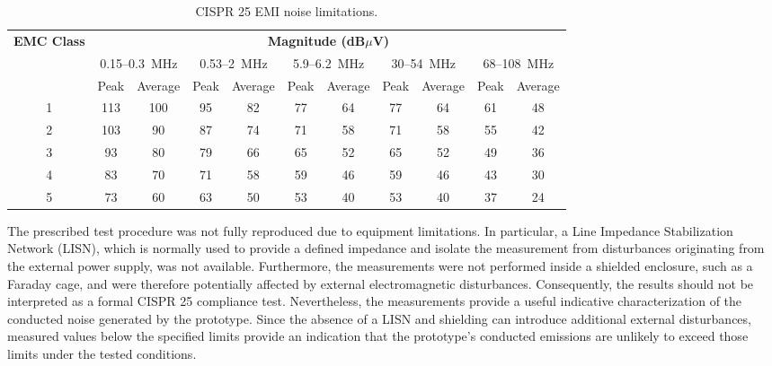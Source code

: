         \begin{table}[htbp]
            \centering
            \caption{CISPR 25 EMI noise limitations.}
            \label{tab:cispr25_limits}
            \begin{tabular}{|c|cc|cc|cc|cc|cc|}
                \hline
                \multirow{2}{*}{\textbf{EMC Class}} &
                \multicolumn{10}{c|}{\textbf{Magnitude (dB$\mu$V)}} \\
                \cline{2-11}
                & \multicolumn{2}{c|}{0.15--0.3~MHz} &
                \multicolumn{2}{c|}{0.53--2~MHz} &
                \multicolumn{2}{c|}{5.9--6.2~MHz} &
                \multicolumn{2}{c|}{30--54~MHz} &
                \multicolumn{2}{c|}{68--108~MHz} \\
                & Peak & Average & Peak & Average & Peak & Average &
                Peak & Average & Peak & Average \\
                \hline
                1 & 113 & 100 & 95 & 82 & 77 & 64 & 77 & 64 & 61 & 48 \\
                2 & 103 & 90  & 87 & 74 & 71 & 58 & 71 & 58 & 55 & 42 \\
                3 & 93  & 80  & 79 & 66 & 65 & 52 & 65 & 52 & 49 & 36 \\
                4 & 83  & 70  & 71 & 58 & 59 & 46 & 59 & 46 & 43 & 30 \\
                5 & 73  & 60  & 63 & 50 & 53 & 40 & 53 & 40 & 37 & 24 \\
                \hline
            \end{tabular}
        \end{table}

        The prescribed test procedure was not fully reproduced due to equipment limitations. In particular, a Line Impedance Stabilization Network (LISN), which is normally used to provide a defined impedance and isolate the measurement from disturbances originating from the external power supply, was not available. Furthermore, the measurements were not performed inside a shielded enclosure, such as a Faraday cage, and were therefore potentially affected by external electromagnetic disturbances. Consequently, the results should not be interpreted as a formal CISPR 25 compliance test. Nevertheless, the measurements provide a useful indicative characterization of the conducted noise generated by the prototype. Since the absence of a LISN and shielding can introduce additional external disturbances, measured values below the specified limits provide an indication that the prototype's conducted emissions are unlikely to exceed those limits under the tested conditions.

